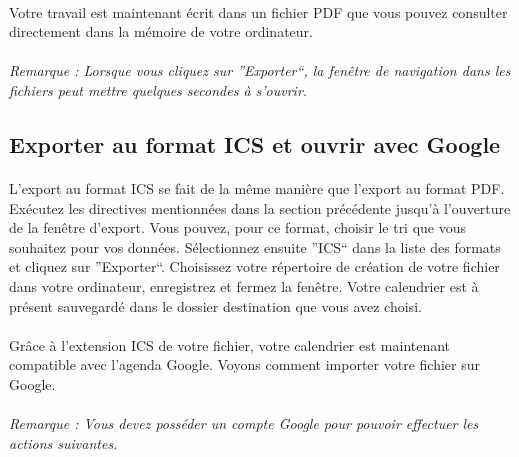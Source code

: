 \documentclass[a4paper,10pt]{book}
\begin{document}
	\paragraph{}
	  Votre travail est maintenant écrit dans un fichier PDF que vous pouvez consulter directement dans la mémoire de votre ordinateur.

	\paragraph{}
	  \textit{Remarque : Lorsque vous cliquez sur ''Exporter``, la fenêtre de navigation dans les fichiers peut mettre quelques secondes à s'ouvrir.}
	
      \subsection{Exporter au format ICS et ouvrir avec Google}
	  
	\paragraph{}
	  L'export au format ICS se fait de la même manière que l'export au format PDF.
	  Exécutez les directives mentionnées dans la section précédente jusqu'à l'ouverture de la fenêtre d'export.
	  Vous pouvez, pour ce format, choisir le tri que vous souhaitez pour vos données.
	  Sélectionnez ensuite ''ICS`` dans la liste des formats et cliquez sur ''Exporter``.
	  Choisissez votre répertoire de création de votre fichier dans votre ordinateur, enregistrez  et fermez la fenêtre.
	  Votre calendrier est à présent sauvegardé dans le dossier destination que vous avez choisi.
	  
	\paragraph{}
	  Grâce à l'extension ICS de votre fichier, votre calendrier est maintenant compatible avec l'agenda Google.
	  Voyons comment importer votre fichier sur Google.
	  
	  
	\paragraph{}
	  \textit{Remarque : Vous devez posséder un compte Google pour pouvoir effectuer les actions suivantes.}
	
\end{document}
